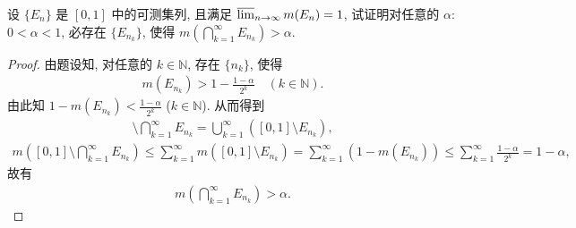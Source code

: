 \documentclass[../../main.tex]{subfiles}%
\begin{document}
\begin{example}
设 $\{E_n\}$ 是 $[0,1]$ 中的可测集列, 且满足 $\varlimsup_{n\to\infty}m(E_n)=1$, 试证明对任意的 $\alpha$: $0<\alpha<1$, 必存在 $\{E_{n_k}\}$, 使得 $m\left(\bigcap\limits_{k=1}^{\infty}E_{n_k}\right)>\alpha$.
\end{example}
\begin{proof}

由题设知, 对任意的 $k\in\mathbb{N}$, 存在 $\{n_k\}$, 使得
\begin{align*}
m(E_{n_k})>1-\frac{1-\alpha}{2^k}\quad (k\in\mathbb{N}).
\end{align*}
由此知 $1-m(E_{n_k})<\frac{1-\alpha}{2^k}$ ($k\in\mathbb{N}$). 从而得到
\begin{align*}
[0,1]\setminus\bigcap\limits_{k=1}^{\infty}E_{n_k}=\bigcup\limits_{k=1}^{\infty}([0,1]\setminus E_{n_k}),
\end{align*}
\begin{align*}
m\left([0,1]\setminus\bigcap\limits_{k=1}^{\infty}E_{n_k}\right)\leqslant\sum\limits_{k=1}^{\infty}m([0,1]\setminus E_{n_k})
=\sum\limits_{k=1}^{\infty}(1-m(E_{n_k}))\leqslant\sum\limits_{k=1}^{\infty}\frac{1-\alpha}{2^k}=1-\alpha,
\end{align*}
故有
\begin{align*}
m\left(\bigcap\limits_{k=1}^{\infty}E_{n_k}\right)>\alpha.
\end{align*}

\end{proof}
\end{document}

